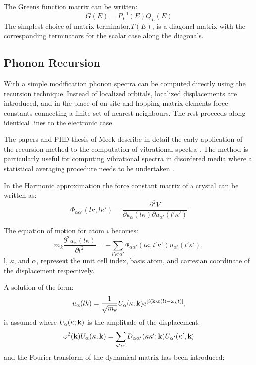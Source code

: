 The Greens function matrix can be written:
%
\begin{equation}
G(E) = P_{L}^{-1}(E)Q_{L}(E)
\end{equation}
%
The simplest choice of matrix terminator,$T(E)$, 
is a diagonal matrix with the corresponding 
terminators for the scalar case along the diagonals.

\subsection{Phonon Recursion}
\label{sec:recphonon}
With a simple modification phonon spectra can be computed directly 
using the recursion technique. Instead of localized orbitals, localized 
displacements are introduced, and in the place of on-site and hopping
matrix elements force constants connecting a finite set of nearest neighbours.
The rest proceeds along identical lines to the electronic case.

The papers and PHD thesis of Meek describe in detail the 
early application of the recursion method to the computation of 
vibrational spectra \cite{meek76, meek78}. 
The method is particularly useful for
computing vibrational spectra in disordered media 
where a statistical averaging procedure needs to be 
undertaken \cite{mookerjee04}.

In the Harmonic approximation the force constant matrix of a crystal can be written as:
%
\begin{equation}
\label{eq:forceconstant}
\Phi_{\alpha\alpha'}(l\kappa,l\kappa') = \frac{\partial^{2}V}{\partial u_{\alpha}(l\kappa) \partial u_{\alpha'}(l'\kappa')}
\end{equation}
%

The equation of motion for atom $i$ becomes:
%
\begin{equation}
m_{k} \frac{\partial^{2} u_\alpha (l\kappa)}{\partial t^{2}} = - \sum_{l'\kappa'\alpha'}
\Phi_{\alpha\alpha'}(l\kappa,l'\kappa')u_{\alpha'}(l'\kappa'),
\end{equation}
%
l, $\kappa$, and $\alpha$, represent the unit cell index, basis atom, and 
cartesian coordinate of the displacement respectively.

A solution of the form:
%
\begin{equation}
u_{\alpha}(lk) = \frac{1}{\sqrt{m_{k}}} U_{\alpha}(\kappa;{\bf k})e^{[i({\bf k}\cdot x(l) - \omega_{{\bf k}}t)]},
\end{equation}
%
is assumed where $U_{\alpha}(\kappa;{\bf k})$ is the amplitude of the displacement.
%
\begin{equation}
\omega^{2}({\bf k}) U_{\alpha}(\kappa, {\bf k}) = \sum_{\kappa'\alpha'}D_{\alpha\alpha'}(\kappa\kappa';{\bf k}) U_{\alpha'}(\kappa',{\bf k})
\end{equation}
%
and the Fourier transform of the dynamical matrix has been introduced:

